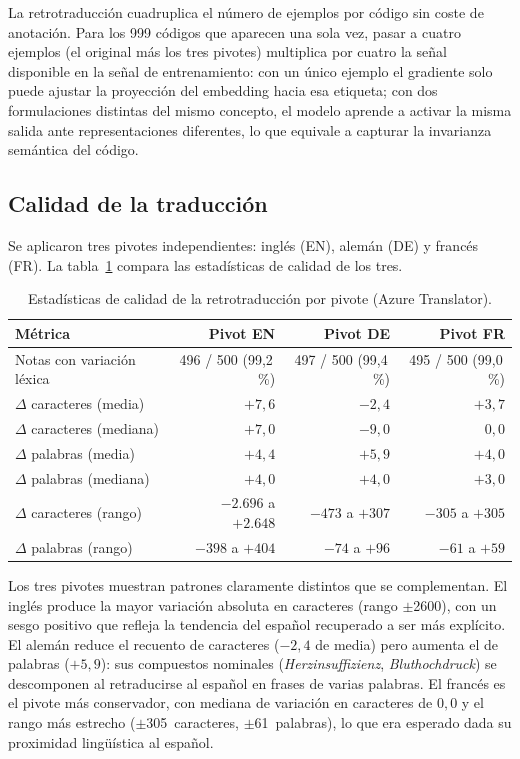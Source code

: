 La retrotraducción cuadruplica el número de ejemplos por código sin coste de anotación. Para los 999 códigos que aparecen una sola vez, pasar a cuatro ejemplos (el original más los tres pivotes) multiplica por cuatro la señal disponible en la señal de entrenamiento: con un único ejemplo el gradiente solo puede ajustar la proyección del embedding hacia esa etiqueta; con dos formulaciones distintas del mismo concepto, el modelo aprende a activar la misma salida ante representaciones diferentes, lo que equivale a capturar la invarianza semántica del código.

\subsection{Calidad de la traducción}

Se aplicaron tres pivotes independientes: inglés (EN), alemán (DE) y francés (FR). La tabla~\ref{tab:bt-quality} compara las estadísticas de calidad de los tres.

\begin{table}[h]
\centering
\caption{Estadísticas de calidad de la retrotraducción por pivote (Azure Translator).}
\label{tab:bt-quality}
\begin{tabular}{lrrr}
\hline
\textbf{Métrica} & \textbf{Pivot EN} & \textbf{Pivot DE} & \textbf{Pivot FR} \\
\hline
Notas con variación léxica  & 496 / 500 (99,2\,\%) & 497 / 500 (99,4\,\%) & 495 / 500 (99,0\,\%) \\
$\Delta$ caracteres (media)      & $+7{,}6$  & $-2{,}4$  & $+3{,}7$  \\
$\Delta$ caracteres (mediana)    & $+7{,}0$  & $-9{,}0$  & $0{,}0$   \\
$\Delta$ palabras (media)   & $+4{,}4$  & $+5{,}9$  & $+4{,}0$  \\
$\Delta$ palabras (mediana) & $+4{,}0$  & $+4{,}0$  & $+3{,}0$  \\
$\Delta$ caracteres (rango)      & $-2.696$ a $+2.648$ & $-473$ a $+307$ & $-305$ a $+305$ \\
$\Delta$ palabras (rango)   & $-398$ a $+404$     & $-74$ a $+96$   & $-61$ a $+59$   \\
\hline
\end{tabular}
\end{table}

Los tres pivotes muestran patrones claramente distintos que se complementan. El inglés produce la mayor variación absoluta en caracteres (rango $\pm$2600), con un sesgo positivo que refleja la tendencia del español recuperado a ser más explícito. El alemán reduce el recuento de caracteres ($-2{,}4$ de media) pero aumenta el de palabras ($+5{,}9$): sus compuestos nominales (\emph{Herzinsuffizienz}, \emph{Bluthochdruck}) se descomponen al retraducirse al español en frases de varias palabras. El francés es el pivote más conservador, con mediana de variación en caracteres de $0{,}0$ y el rango más estrecho ($\pm$305~caracteres, $\pm$61~palabras), lo que era esperado dada su proximidad lingüística al español.

